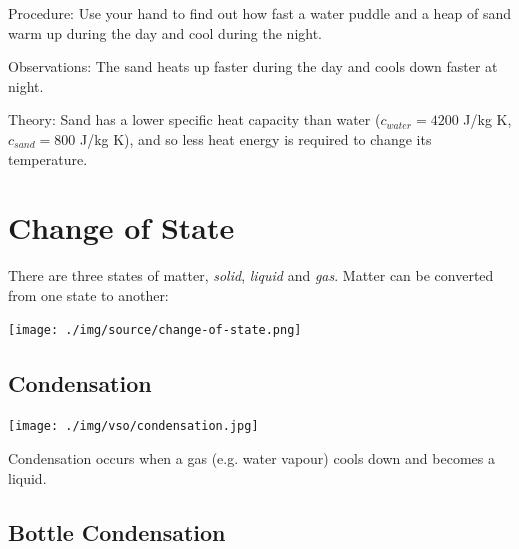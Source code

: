 \begin{multicols}{2}
\begin{description*}
\item[Procedure:]{Use your hand to find out how fast a water puddle and a heap of sand warm up during the day and cool during the night.}
\item[Observations:]{The sand heats up faster during the day and cools down faster at night.}
\item[Theory:]{Sand has a lower specific heat capacity than water ($c_{water} = 4200$ J/kg K, $c_{sand} = 800$ J/kg K), and so less heat energy is required to change its temperature.}
\end{description*}


\section*{Change of State}

There are three states of matter, \emph{solid}, \emph{liquid} and \emph{gas}. Matter can be converted from one state to another:

\begin{center}
\texttt{[image: ./img/source/change-of-state.png]}
\end{center}


\subsection{Condensation}

\begin{center}
\texttt{[image: ./img/vso/condensation.jpg]}
\end{center}

Condensation occurs when a gas (e.g. water vapour) cools down and becomes a liquid.

\subsection{Bottle Condensation}


\end{multicols}
